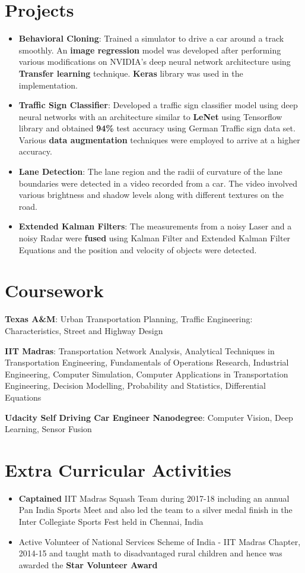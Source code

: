 \documentclass[letterpaper,11pt]{article}
\newcommand{\resumeItem}[2]{
  \item\small{
    \textbf{#1}{: #2 \vspace{-2pt}}
  }
}
\newcommand{\rit}[1]{
  \item\small{
    {#1 \vspace{-6pt}}
  }
}
\newcommand{\resumeSubItem}[2]{\resumeItem{#1}{#2}\vspace{-4pt}}
\newcommand{\resumeSubHeadingListStart}{\begin{description}[leftmargin=*]}
\newcommand{\resumeSubHeadingListEnd}{\end{description}}
\newcommand{\resumeItemListStart}{\begin{itemize}[leftmargin=*]}
\newcommand{\resumeItemListEnd}{\end{itemize}\vspace{-4pt}}
\begin{document}
\section{Projects}
  \resumeItemListStart
   \justifying \resumeSubItem{Behavioral Cloning}
      {Trained a simulator to drive a car around a track smoothly. An \textbf{image regression} model was developed after performing various modifications on NVIDIA's deep neural network architecture using \textbf{Transfer learning} technique. \textbf{Keras} library was used in the implementation.}
    \justifying\resumeSubItem{Traffic Sign Classifier}
      {Developed a traffic sign classifier model using deep neural networks with an architecture similar to \textbf{LeNet} using Tensorflow library and obtained \textbf{94\%} test accuracy using German Traffic sign data set. Various \textbf{data augmentation} techniques were employed to arrive at a higher accuracy.}
    \justifying\resumeSubItem{Lane Detection}
      {The lane region and the radii of curvature of the lane boundaries were detected in a video recorded from a car. The video involved various brightness and shadow levels along with different textures on the road.}
    \justifying\resumeSubItem{Extended Kalman Filters}
      {The measurements from a noisy Laser and a noisy Radar were \textbf{fused} using Kalman Filter and Extended Kalman Filter Equations and the position and velocity of objects were detected.}
  \resumeItemListEnd

\section{Coursework}
  \resumeSubHeadingListStart
    \resumeSubItem{Texas A\&M}
    {Urban Transportation Planning, Traffic Engineering: Characteristics, Street and Highway Design}
    \justifying\resumeSubItem
      {IIT Madras}{Transportation Network Analysis, Analytical Techniques in Transportation Engineering, Fundamentals of Operations Research, Industrial Engineering, Computer Simulation, Computer Applications in Transportation Engineering, Decision Modelling, Probability and Statistics, Differential Equations}
    \resumeSubItem
      {Udacity Self Driving Car Engineer Nanodegree}{Computer Vision, Deep Learning, Sensor Fusion}
  \resumeSubHeadingListEnd


\section{Extra Curricular Activities}
  \resumeItemListStart
    \justifying\rit{\textbf{Captained} IIT Madras Squash Team during 2017-18 including an annual Pan India Sports Meet and also led the team to a silver medal finish in the Inter Collegiate Sports Fest held in Chennai, India}
    \justifying\rit{Active Volunteer of National Services Scheme of India - IIT Madras Chapter, 2014-15 and taught math to disadvantaged rural children and hence was awarded the \textbf{Star Volunteer Award}}
  \resumeItemListEnd

\end{document}
